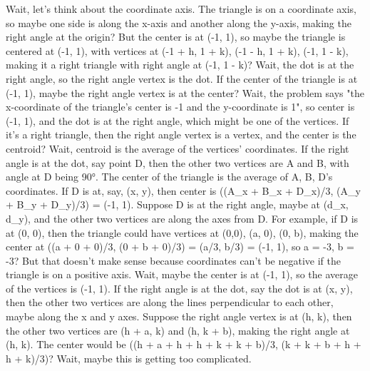 Wait, let's think about the coordinate axis. The triangle is on a coordinate axis, so maybe one side is along the x-axis and another along the y-axis, making the right angle at the origin? But the center is at (-1, 1), so maybe the triangle is centered at (-1, 1), with vertices at (-1 + h, 1 + k), (-1 - h, 1 + k), (-1, 1 - k), making it a right triangle with right angle at (-1, 1 - k)? Wait, the dot is at the right angle, so the right angle vertex is the dot. If the center of the triangle is at (-1, 1), maybe the right angle vertex is at the center? Wait, the problem says "the x-coordinate of the triangle's center is -1 and the y-coordinate is 1", so center is (-1, 1), and the dot is at the right angle, which might be one of the vertices. If it's a right triangle, then the right angle vertex is a vertex, and the center is the centroid? Wait, centroid is the average of the vertices' coordinates. If the right angle is at the dot, say point D, then the other two vertices are A and B, with angle at D being 90°. The center of the triangle is the average of A, B, D's coordinates. If D is at, say, (x, y), then center is ((A_x + B_x + D_x)/3, (A_y + B_y + D_y)/3) = (-1, 1). Suppose D is at the right angle, maybe at (d_x, d_y), and the other two vertices are along the axes from D. For example, if D is at (0, 0), then the triangle could have vertices at (0,0), (a, 0), (0, b), making the center at ((a + 0 + 0)/3, (0 + b + 0)/3) = (a/3, b/3) = (-1, 1), so a = -3, b = -3? But that doesn't make sense because coordinates can't be negative if the triangle is on a positive axis. Wait, maybe the center is at (-1, 1), so the average of the vertices is (-1, 1). If the right angle is at the dot, say the dot is at (x, y), then the other two vertices are along the lines perpendicular to each other, maybe along the x and y axes. Suppose the right angle vertex is at (h, k), then the other two vertices are (h + a, k) and (h, k + b), making the right angle at (h, k). The center would be ((h + a + h + h + k + k + b)/3, (k + k + b + h + h + k)/3)? Wait, maybe this is getting too complicated. 

